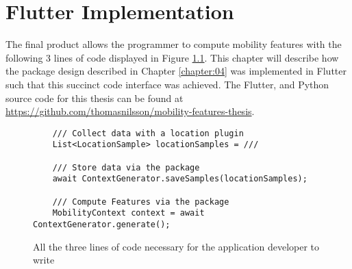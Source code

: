 \chapter{Flutter Implementation}
\label{chapter:05}
The final product allows the programmer to compute mobility features with the following 3 lines of code displayed in Figure \ref{fig:code-example-intro}. This chapter will describe how the package design described in Chapter \ref{chapter:04} was implemented in Flutter such that this succinct code interface was achieved.  The Flutter, and Python source code for this thesis can be found at \url{https://github.com/thomasnilsson/mobility-features-thesis}.

\begin{figure}[h]
    \centering
    \begin{verbatim}
    /// Collect data with a location plugin
    List<LocationSample> locationSamples = ///

    /// Store data via the package
    await ContextGenerator.saveSamples(locationSamples);
    
    /// Compute Features via the package
    MobilityContext context = await ContextGenerator.generate();
    \end{verbatim}
    \caption{All the three lines of code necessary for the application developer to write}
    \label{fig:code-example-intro}
\end{figure}









